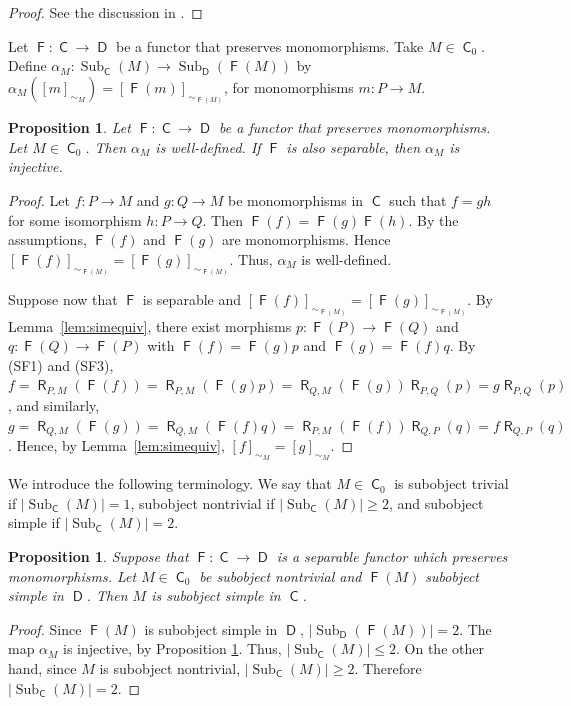 \documentclass[12pt]{amsart}
\newtheorem{prop}[thm]{Proposition}
\theoremstyle{definition}
\DeclareMathOperator{\C}{\mathsf C}
\DeclareMathOperator{\D}{\mathsf D}
\DeclareMathOperator{\Sub}{Sub}
\DeclareMathOperator{\F}{\mathsf F}
\DeclareMathOperator{\R}{\mathsf R}
\begin{document}
\begin{proof}
See the discussion in \cite[p.~122]{maclane1998}.
\end{proof}

Let $\F : \C \to \D$ be a functor
that preserves monomorphisms.
Take $M \in \C_0$.
Define $\alpha_{M} : 
\Sub_{\C}(M) \to \Sub_{\D}(\F(M))$
by $\alpha_{M}( [ m ]_{\sim_M} ) = 
[\F(m)]_{\sim_{\F(M)}}$, for 
monomorphisms $m : P \to M$.

\begin{prop}\label{prop:injective}
Let $\F : \C \to \D$ be a functor
that preserves monomorphisms. Let $M \in \C_0$. 
Then $\alpha_{M}$ is well-defined.
If $\F$ is also separable, then
$\alpha_{M}$ is injective.
\end{prop}

\begin{proof}
Let $f : P \to M$ and $g : Q \to M$ be monomorphisms 
in $\C$ such that $f = gh$ for some isomorphism 
$h : P \to Q$. Then $\F(f)=\F(g)\F(h)$.
By the assumptions,
$\F(f)$ and $\F(g)$ are monomorphisms. 
Hence $[\F(f)]_{\sim_{\F(M)}} = [\F(g)]_{\sim_{\F(M)}}$.
Thus, $\alpha_M$ is well-defined.

Suppose now that $\F$ is separable and 
$[\F(f)]_{\sim_{\F(M)}} = [\F(g)]_{\sim_{\F(M)}}$.
By Lemma~\ref{lem:simequiv}, there exist morphisms
$p : \F(P) \to \F(Q)$ and $q : \F(Q) \to \F(P)$ with
$\F(f) = \F(g)p$ and $\F(g) = \F(f)q$.
By (SF1) and (SF3),
$f =\R_{P,M}(\F(f))
= \R_{P,M}(\F(g)p)
= \R_{Q,M}(\F(g)) \R_{P,Q}(p)
= g \R_{P,Q}(p)$,
and similarly,
$g = \R_{Q,M}(\F(g))
= \R_{Q,M}(\F(f)q)
= \R_{P,M}(\F(f)) \R_{Q,P}(q)
= f \R_{Q,P}(q)$.
Hence, by Lemma~\ref{lem:simequiv},
$[f]_{\sim_M} = [g]_{\sim_M}$.
\end{proof}

We introduce the 
following terminology.
We say that $M \in \C_0$ is
subobject trivial if 
$|\Sub_{\C}(M)| = 1$,
subobject nontrivial if 
$|\Sub_{\C}(M)| \geq 2$, and
subobject simple if 
$|\Sub_{\C}(M)|=2$.

\begin{prop}\label{prop:subobjectsimple}
Suppose that $\F : \C \to \D$ is a separable
functor which preserves monomorphisms. 
Let $M \in \C_0$ be subobject nontrivial
and $\F(M)$ subobject simple in $\D$. Then
$M$ is subobject simple in $\C$.
\end{prop}

\begin{proof}
Since $\F(M)$ is subobject simple in $\D$,
$|\Sub_{\D}(\F(M))|=2$.
The map $\alpha_M$ is injective,
by Proposition \ref{prop:injective}.
Thus, $|\Sub_{\C}(M)| \leq 2$. 
On the other hand, since
$M$ is subobject nontrivial, 
$|\Sub_{\C}(M)| \geq 2$.
Therefore $|\Sub_{\C}(M)|=2$.
\end{proof}
\end{document}
